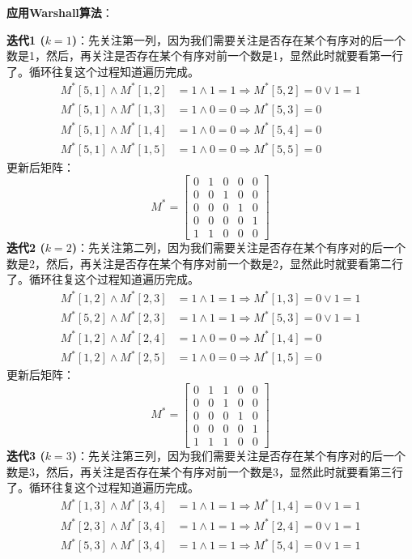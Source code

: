 \textbf{应用Warshall算法}：

\textbf{迭代1 ($k=1$)}：先关注第一列，因为我们需要关注是否存在某个有序对的后一个数是1，然后，再关注是否存在某个有序对前一个数是1，显然此时就要看第一行了。循环往复这个过程知道遍历完成。
\begin{align*}
M^*[5,1] \land M^*[1,2] &= 1 \land 1 = 1 \Rightarrow M^*[5,2] = 0 \lor 1 = 1 \\
M^*[5,1] \land M^*[1,3] &= 1 \land 0 = 0 \Rightarrow M^*[5,3] = 0 \\
M^*[5,1] \land M^*[1,4] &= 1 \land 0 = 0 \Rightarrow M^*[5,4] = 0 \\
M^*[5,1] \land M^*[1,5] &= 1 \land 0 = 0 \Rightarrow M^*[5,5] = 0
\end{align*}
更新后矩阵：
\[
M^* = \begin{bmatrix}
0 & 1 & 0 & 0 & 0 \\
0 & 0 & 1 & 0 & 0 \\
0 & 0 & 0 & 1 & 0 \\
0 & 0 & 0 & 0 & 1 \\
1 & 1 & 0 & 0 & 0
\end{bmatrix}
\]
\textbf{迭代2 ($k=2$)}：先关注第二列，因为我们需要关注是否存在某个有序对的后一个数是2，然后，再关注是否存在某个有序对前一个数是2，显然此时就要看第二行了。循环往复这个过程知道遍历完成。
\begin{align*}
M^*[1,2] \land M^*[2,3] &= 1 \land 1 = 1 \Rightarrow M^*[1,3] = 0 \lor 1 = 1 \\
M^*[5,2] \land M^*[2,3] &= 1 \land 1 = 1 \Rightarrow M^*[5,3] = 0 \lor 1 = 1 \\
M^*[1,2] \land M^*[2,4] &= 1 \land 0 = 0 \Rightarrow M^*[1,4] = 0 \\
M^*[1,2] \land M^*[2,5] &= 1 \land 0 = 0 \Rightarrow M^*[1,5] = 0
\end{align*}
更新后矩阵：
\[
M^* = \begin{bmatrix}
0 & 1 & 1 & 0 & 0 \\
0 & 0 & 1 & 0 & 0 \\
0 & 0 & 0 & 1 & 0 \\
0 & 0 & 0 & 0 & 1 \\
1 & 1 & 1 & 0 & 0
\end{bmatrix}
\]
\textbf{迭代3 ($k=3$)}：先关注第三列，因为我们需要关注是否存在某个有序对的后一个数是3，然后，再关注是否存在某个有序对前一个数是3，显然此时就要看第三行了。循环往复这个过程知道遍历完成。
\begin{align*}
M^*[1,3] \land M^*[3,4] &= 1 \land 1 = 1 \Rightarrow M^*[1,4] = 0 \lor 1 = 1 \\
M^*[2,3] \land M^*[3,4] &= 1 \land 1 = 1 \Rightarrow M^*[2,4] = 0 \lor 1 = 1 \\
M^*[5,3] \land M^*[3,4] &= 1 \land 1 = 1 \Rightarrow M^*[5,4] = 0 \lor 1 = 1
\end{align*}
